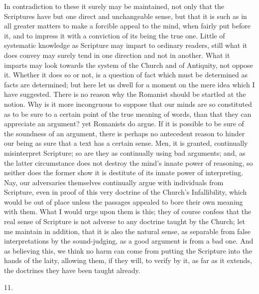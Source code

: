In contradiction to these it surely may be maintained, not only
that the Scriptures have but one direct and unchangeable sense, but
that it is such as in all greater matters to make a forcible appeal to
the mind, when fairly put before it, and to impress it with a
conviction of its being the true one. Little of systematic knowledge
as Scripture may impart to ordinary readers, still what it does convey
may surely tend in one direction and not in another. What it imparts
may look towards the system of the Church and of Antiquity, not oppose
it. Whether it does so or not, is a question of fact which must be
determined as facts are determined; but here let us dwell for a moment
on the mere idea which I have suggested. There is no reason why the
Romanist should be startled at the notion. Why is it more incongruous
to suppose that our minds are so constituted as to be sure to a
certain point of the true meaning of words, than that they can
appreciate an argument? yet Romanists do argue. If it is possible to
be sure of the soundness of an argument, there is perhaps no
antecedent reason to hinder our being as sure that a text has a
certain sense. Men, it is granted, continually misinterpret Scripture;
so are they as continually using bad arguments; and, as the latter
circumstance does not destroy the mind's innate power of reasoning, so
neither does the former show it is destitute of its innate power of
interpreting. Nay, our adversaries themselves continually argue with
individuals from Scripture, even in proof of this very doctrine of the
Church's Infallibility, which would be out of place unless the
passages appealed to bore their own meaning with them. What I would
urge upon them is this; they of course confess that the real sense of
Scripture is not adverse to any doctrine taught by the Church; let me
maintain in addition, that it is also the natural sense, as separable
from false interpretations by the sound-judging, as a good argument is
from a bad one. And as believing this, we think no harm can come from
putting the Scripture into the hands of the laity, allowing them, if
they will, to verify by it, as far as it extends, the doctrines they
have been taught already.

11.

